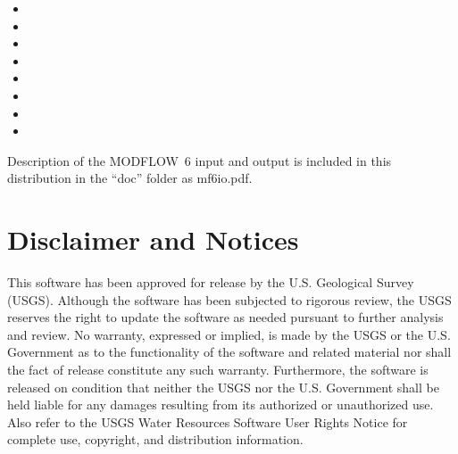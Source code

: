 \documentclass[11pt,twoside,twocolumn]{usgsreport}
\begin{document}
\begin{itemize}

\item {}

\item {}

\item {}

\item {}

\item {}

\item {}

\item {}

\item {}

\end{itemize}
 
\noindent Description of the MODFLOW~6 input and output is included in this distribution in the ``doc'' folder as mf6io.pdf.


\section{Disclaimer and Notices}

This software has been approved for release by the U.S. Geological Survey (USGS). Although the software has been subjected to rigorous review, the USGS reserves the right to update the software as needed pursuant to further analysis and review. No warranty, expressed or implied, is made by the USGS or the U.S. Government as to the functionality of the software and related material nor shall the fact of release constitute any such warranty. Furthermore, the software is released on condition that neither the USGS nor the U.S. Government shall be held liable for any damages resulting from its authorized or unauthorized use. Also refer to the USGS Water Resources Software User Rights Notice for complete use, copyright, and distribution information.
\end{document}
